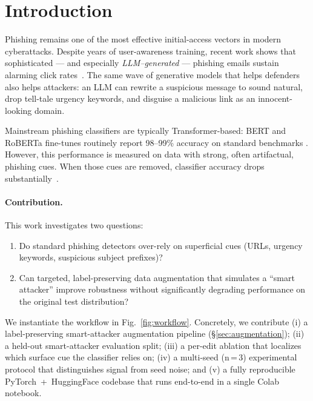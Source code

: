 \documentclass[conference]{IEEEtran}
\begin{document}
\section{Introduction}
\label{sec:intro}

Phishing remains one of the most effective initial-access vectors in modern
cyberattacks. Despite years of user-awareness training, recent work shows that
sophisticated --- and especially \emph{LLM--generated} --- phishing emails
sustain alarming click rates~\cite{kim2025llms}. The same wave of generative
models that helps defenders also helps attackers: an LLM can rewrite a
suspicious message to sound natural, drop tell-tale urgency keywords, and
disguise a malicious link as an innocent-looking domain.

Mainstream phishing classifiers are typically Transformer-based: BERT and
RoBERTa fine-tunes routinely report 98--99\% accuracy on standard benchmarks
\cite{atawneh2023phishing,phishingbertroberta2026,indepthphishingdl2025}.
However, this performance is measured on data with strong, often artifactual,
phishing cues. When those cues are removed, classifier accuracy drops
substantially~\cite{adversarialphishing2023,explainabletransformer2025,robustllmphish2025}.

\paragraph*{Contribution.} This work investigates two questions:
\begin{enumerate}
  \item Do standard phishing detectors over-rely on superficial cues
        (URLs, urgency keywords, suspicious subject prefixes)?
  \item Can targeted, label-preserving data augmentation that simulates
        a ``smart attacker'' improve robustness without significantly
        degrading performance on the original test distribution?
\end{enumerate}

We instantiate the workflow in Fig.~\ref{fig:workflow}. Concretely, we
contribute (i) a label-preserving smart-attacker augmentation pipeline
(\S\ref{sec:augmentation}); (ii) a held-out smart-attacker evaluation
split; (iii) a per-edit ablation that localizes which surface cue the
classifier relies on; (iv) a multi-seed (n\,=\,3) experimental protocol
that distinguishes signal from seed noise; and (v) a fully reproducible
PyTorch~+~HuggingFace codebase that runs end-to-end in a single Colab
notebook.
\end{document}
